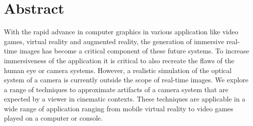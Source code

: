 \documentclass{thesisclass}
\let\cleardoublepage\clearpage
\begin{document}

\frontmatter
{}

\blankpage

\chapter*{Abstract}
With the rapid advance in computer graphics in various application like video games, virtual reality and augmented reality, the generation of immersive real-time images has become a critical component of these future systems.
To increase immersiveness of the application it is critical to also recreate the flaws of the human eye or camera systems.
However, a realistic simulation of the optical system of a camera is currently outside the scope of real-time images.
We explore a range of techniques to approximate artifacts of a camera system that are expected by a viewer in cinematic contexts.
These techniques are applicable in a wide range of application ranging from mobile virtual reality to video games played on a computer or console.

\tableofcontents
\blankpage


\mainmatter
{}




\cleardoublepage
{}
{}

{}	%
{}	%
												  


\end{document}
